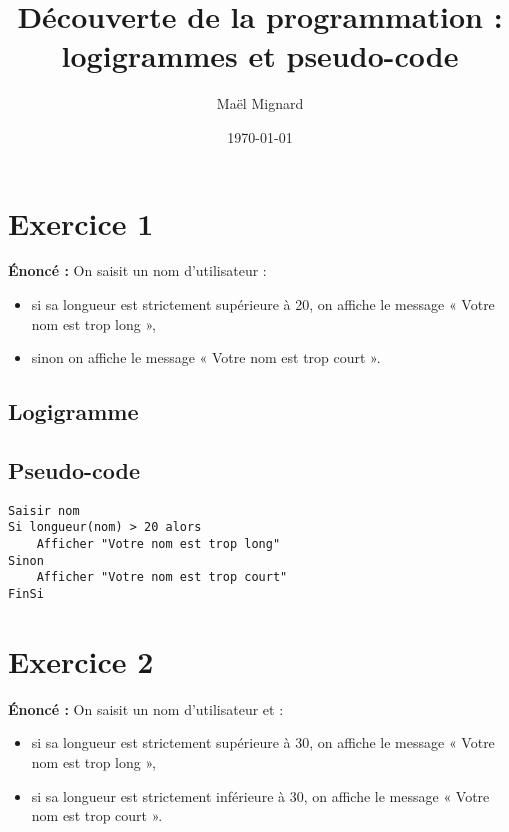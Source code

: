 \documentclass[12pt,a4paper]{article}
\title{Découverte de la programmation : logigrammes et pseudo-code}
\author{Maël Mignard}
\date{\today}
\begin{document}
\maketitle

\section*{Exercice 1}
\textbf{Énoncé :} On saisit un nom d’utilisateur :
\begin{itemize}
  \item si sa longueur est strictement supérieure à 20, on affiche le message « Votre nom est trop long »,
  \item sinon on affiche le message « Votre nom est trop court ».
\end{itemize}

\subsection*{Logigramme}
\begin{center}
\end{center}

\subsection*{Pseudo-code}
\begin{verbatim}
Saisir nom
Si longueur(nom) > 20 alors
    Afficher "Votre nom est trop long"
Sinon
    Afficher "Votre nom est trop court"
FinSi
\end{verbatim}

\section*{Exercice 2}
\textbf{Énoncé :} On saisit un nom d’utilisateur et :
\begin{itemize}
  \item si sa longueur est strictement supérieure à 30, on affiche le message « Votre nom est trop long »,
  \item si sa longueur est strictement inférieure à 30, on affiche le message « Votre nom est trop court ».
\end{itemize}
\end{document}

